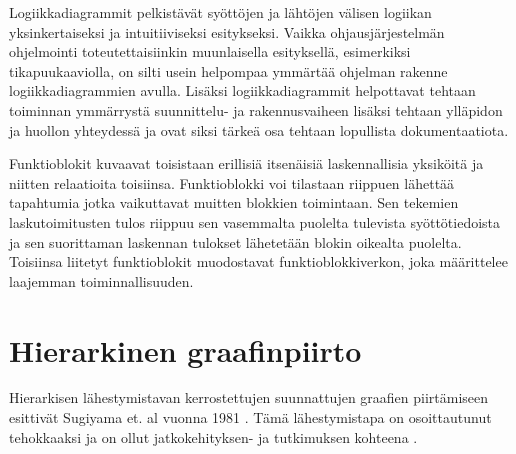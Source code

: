 \documentclass[finnish,12pt]{article}
\begin{document}
Logiikkadiagrammit pelkistävät syöttöjen ja lähtöjen välisen logiikan
yksinkertaiseksi ja intuitiiviseksi esitykseksi. Vaikka ohjausjärjestelmän
ohjelmointi toteutettaisiinkin muunlaisella esityksellä, esimerkiksi
tikapuukaaviolla, on silti usein helpompaa ymmärtää ohjelman rakenne
logiikkadiagrammien avulla. Lisäksi logiikkadiagrammit helpottavat tehtaan
toiminnan ymmärrystä suunnittelu- ja rakennusvaiheen lisäksi tehtaan ylläpidon
ja huollon yhteydessä ja ovat siksi tärkeä osa tehtaan lopullista
dokumentaatiota.

Funktioblokit kuvaavat toisistaan erillisiä itsenäisiä laskennallisia yksiköitä
ja niitten relaatioita toisiinsa. Funktioblokki voi tilastaan riippuen lähettää
tapahtumia jotka vaikuttavat muitten blokkien toimintaan. Sen tekemien
laskutoimitusten tulos riippuu sen vasemmalta puolelta tulevista
syöttötiedoista ja sen suorittaman laskennan tulokset lähetetään blokin oikealta puolelta.
Toisiinsa liitetyt funktioblokit muodostavat funktioblokkiverkon, joka määrittelee laajemman toiminnallisuuden.





	\clearpage
	\section{Hierarkinen graafinpiirto}

Hierarkisen lähestymistavan kerrostettujen suunnattujen graafien piirtämiseen
esittivät Sugiyama et. al vuonna 1981 \cite{RefWorks:9}. Tämä lähestymistapa on
osoittautunut tehokkaaksi ja on ollut jatkokehityksen- ja tutkimuksen kohteena
\cite{RefWorks:28}.
\end{document}
